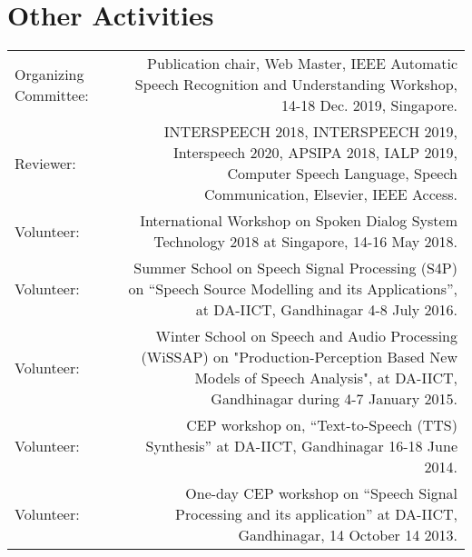 \documentclass[10pt]{article}
\begin{document}
\section*{Other Activities}
\begin{tabular}{L!{\VRule}R}
Organizing Committee: & Publication chair, Web Master, IEEE Automatic Speech Recognition and Understanding Workshop, 14-18 Dec. 2019, Singapore.\vspace{0.1cm}\\
Reviewer: & INTERSPEECH 2018, INTERSPEECH 2019, Interspeech 2020, APSIPA 2018, IALP 2019, Computer Speech Language, Speech Communication, Elsevier, IEEE Access.\vspace{0.1cm}\\
Volunteer:&International Workshop on Spoken Dialog System Technology 2018 at Singapore, 14-16 May 2018.\vspace{0.1cm}\\
Volunteer:&Summer School on Speech Signal Processing (S4P) on ``Speech Source Modelling and its Applications'', at {DA-IICT, Gandhinagar} 4-8 July 2016.\vspace{0.1cm}\\
Volunteer:& Winter School on Speech and Audio Processing (WiSSAP) on "Production-Perception Based New Models of Speech Analysis", at DA-IICT, Gandhinagar during 4-7 January 2015.\vspace{0.1cm}\\
Volunteer: & CEP workshop on, ``Text-to-Speech (TTS) Synthesis'' at DA-IICT, Gandhinagar 16-18 June 2014.\vspace{0.1cm}\\
Volunteer:& One-day CEP workshop on ``Speech Signal Processing and its application'' at {DA-IICT, Gandhinagar}, 14 October 14 2013.
\end{tabular}
\end{document}

